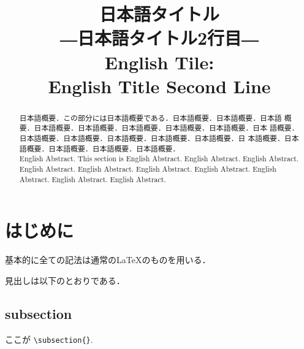 \documentclass{jsarticle}
\title{日本語タイトル \\ 
―日本語タイトル2行目― \\
English Tile: \\
English Title Second Line\\
}
\begin{document}
%
\makeatletter 
\def\ps@myheadings{%
\let\ps@jpl@in\ps@plain%
\def\@evenhead{\reset@font\hfil\leftmark\hfil}%
\def\@oddhead{\reset@font\hfil\rightmark\hfil}%
\let\@mkboth\@gobbletwo%
\let\sectionmark\@gobble%
\let\subsectionmark\@gobble%
% 
\def\@oddfoot{\reset@font\hfil-- \thepage --\hfil}%
\let\@evenfoot\@oddfoot 
} 
\makeatother 


\setcounter{page}{ 9 } 
\pagestyle{myheadings} 




\maketitle
\thispagestyle{myheadings}

%
\begin{abstract}

日本語概要．この部分には日本語概要である．日本語概要．日本語概要．日本語
 概要．日本語概要．日本語概要．日本語概要．日本語概要．日本語概要．日本
 語概要．日本語概要．日本語概要．日本語概要．日本語概要．日本語概要．日
 本語概要．日本語概要．日本語概要．日本語概要．日本語概要．\\


English Abstract. This section is English Abstract. English
 Abstract. English Abstract. English Abstract. English Abstract. English
 Abstract. English Abstract. English Abstract. English Abstract. English
 Abstract. 


\end{abstract}
%
\section{はじめに}

基本的に全ての記法は通常のLaTeXのものを用いる．

見出しは以下のとおりである．

\subsection{subsection}

ここが \verb|\subsection{}|.
\end{document}
